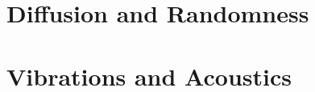 \documentclass[t,10pt,fleqn]{beamer}
\begin{document}
\section{Diffusion and Randomness}
\section{Vibrations and Acoustics}
\end{document}
